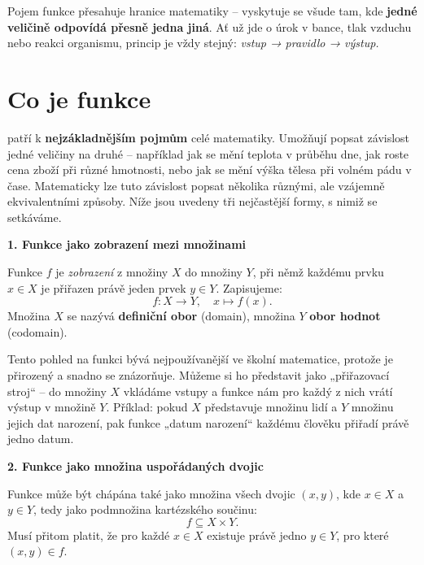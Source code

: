 \documentclass[12pt,a4paper]{article}
\begin{document}
\begin{notebox}
Pojem funkce přesahuje hranice matematiky – vyskytuje se všude tam, kde \textbf{jedné veličině odpovídá přesně jedna jiná}.  
Ať už jde o úrok v bance, tlak vzduchu nebo reakci organismu, princip je vždy stejný:  
\textit{vstup → pravidlo → výstup.}
\end{notebox}



\section{Co je funkce}

 patří k \textbf{nejzákladnějším pojmům} celé matematiky.  
Umožňují popsat závislost jedné veličiny na druhé – například jak se mění teplota v průběhu dne, jak roste cena zboží při různé hmotnosti, nebo jak se mění výška tělesa při volném pádu v čase.  
Matematicky lze tuto závislost popsat několika různými, ale vzájemně ekvivalentními způsoby.  
Níže jsou uvedeny tři nejčastější formy, s nimiž se setkáváme.

\begin{definitionbox}
    \textbf{1. Funkce jako zobrazení mezi množinami}

    Funkce \( f \) je \emph{zobrazení} z množiny \( X \) do množiny \( Y \), 
    při němž každému prvku \( x \in X \) je přiřazen právě jeden prvek \( y \in Y \).  
    Zapisujeme:
    \[
    f: X \rightarrow Y, \quad x \mapsto f(x).
    \]
    Množina \( X \) se nazývá \textbf{definiční obor} (domain), množina \( Y \) \textbf{obor hodnot} (codomain).
\end{definitionbox}

Tento pohled na funkci bývá nejpoužívanější ve školní matematice, 
protože je přirozený a snadno se znázorňuje.  
Můžeme si ho představit jako „přiřazovací stroj“ – do množiny \( X \) 
vkládáme vstupy a funkce nám pro každý z nich vrátí výstup v množině \( Y \).  
Příklad: pokud \( X \) představuje množinu lidí a \( Y \) množinu jejich dat narození, 
pak funkce „datum narození“ každému člověku přiřadí právě jedno datum.

\smallskip

\begin{definitionbox}
    \textbf{2. Funkce jako množina uspořádaných dvojic}

    Funkce může být chápána také jako množina všech dvojic \((x, y)\), kde \(x \in X\) a \(y \in Y\), tedy jako podmnožina kartézského součinu:
    \[
    f \subseteq X \times Y.
    \]
    Musí přitom platit, že pro každé \(x \in X\) existuje právě jedno \(y \in Y\), pro které \((x,y) \in f.\)
\end{definitionbox}
\end{document}
